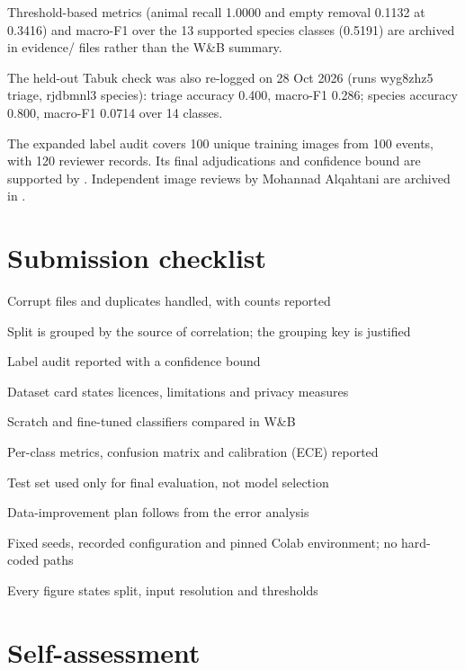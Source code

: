 \documentclass[11pt,a4paper]{article}
\begin{document}
Threshold-based metrics (animal recall 1.0000 and empty removal 0.1132 at 0.3416) and macro-F1 over the 13 supported species classes (0.5191) are archived in evidence/ files rather than the W\&B summary.

The held-out Tabuk check was also re-logged on 28 Oct 2026 (runs wyg8zhz5 triage, rjdbmnl3 species): triage accuracy 0.400, macro-F1 0.286; species accuracy 0.800, macro-F1 0.0714 over 14 classes.

The expanded label audit covers 100 unique training images from 100 events, with 120 reviewer records. Its final adjudications and confidence bound are supported by . Independent image reviews by Mohannad Alqahtani are archived in .

\section{Submission checklist}

\begin{checklist}
  \item Corrupt files and duplicates handled, with counts reported
  \item Split is grouped by the source of correlation; the grouping key is justified
  \item Label audit reported with a confidence bound
  \item Dataset card states licences, limitations and privacy measures
  \item Scratch and fine-tuned classifiers compared in W\&B
  \item Per-class metrics, confusion matrix and calibration (ECE) reported
  \item Test set used only for final evaluation, not model selection
  \item Data-improvement plan follows from the error analysis
  \item Fixed seeds, recorded configuration and pinned Colab environment; no hard-coded paths
  \item Every figure states split, input resolution and thresholds
\end{checklist}

\section{Self-assessment}
\end{document}
